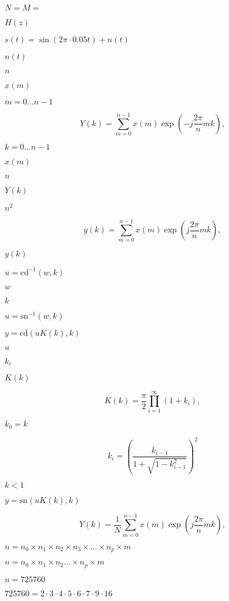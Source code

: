 \documentclass{article}
\begin{document}
$N=M=$
\pagebreak

$H(z)$
\pagebreak

$s(t) = \sin(2\pi \cdot 0.05 t) + n(t)$
\pagebreak

$n(t)$
\pagebreak

$ n $
\pagebreak

$ x(m) $
\pagebreak

$ m = 0 \ldots n-1 $
\pagebreak

\[ Y(k) = \sum_{m = 0}^{n-1} x(m) \exp \left( -j \frac{2\pi}{n} m k \right), \]
\pagebreak

$ k = 0 \ldots n-1 $
\pagebreak

$x(m)$
\pagebreak

$n$
\pagebreak

$Y(k)$
\pagebreak

$ n^2 $
\pagebreak

\[ y(k) = \sum_{m = 0}^{n-1} x(m) \exp \left( j \frac{2\pi}{n} m k \right), \]
\pagebreak

$y(k)$
\pagebreak

$ u = \textrm{cd}^{-1}(w, k)$
\pagebreak

$ w $
\pagebreak

$ k $
\pagebreak

$ u = \textrm{sn}^{-1}(w, k)$
\pagebreak

$ y = \textrm{cd}(u K(k), k)$
\pagebreak

$ u $
\pagebreak

$ k_i $
\pagebreak

$ K(k) $
\pagebreak

\[ K(k) = \frac{\pi}{2} \prod_{i = 1}^{\infty}(1+k_i), \]
\pagebreak

$ k_0 = k$
\pagebreak

\[ k_i = \left( \frac{k_{i-1}} { 1+\sqrt{1-k_{i-1}^2} } \right)^2 \]
\pagebreak

$ k<1 $
\pagebreak

$ y = \textrm{sn}(u K(k), k)$
\pagebreak

\[ Y(k) = \frac{1}{N} \sum_{m = 0}^{n-1} x(m) \exp \left( j \frac{2\pi}{n} m k \right), \]
\pagebreak

$n = n_0 \times n_1 \times n_2 \times n_3 \times \ldots \times n_p \times m$
\pagebreak

$n = n_0 \times n_1 \times n_2 \ldots \times n_p \times m$
\pagebreak

$ n = 725760 $
\pagebreak

$725760 = 2 \cdot 3 \cdot 4 \cdot 5 \cdot 6 \cdot 7 \cdot 9 \cdot 16 $
\pagebreak
\end{document}
